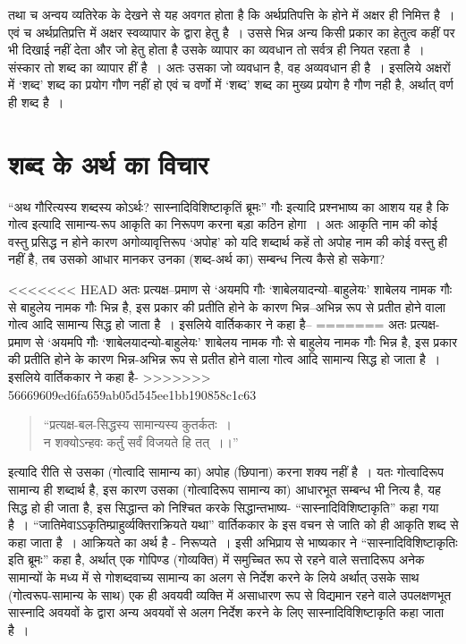 तथा च अन्वय व्यतिरेक के देखने से यह अवगत होता है कि अर्थप्रतिपत्ति के होने में अक्षर ही निमित्त है~। एवं च अर्थप्रतिप्रत्ति में अक्षर स्वव्यापार के द्वारा हेतु है~। उससे भिन्न अन्य किसी प्रकार का हेतुत्व कहीं पर भी दिखाई नहीं देता और जो हेतु होता है उसके व्यापार का व्यवधान तो सर्वत्र ही नियत रहता है~। संस्कार तो शब्द का व्यापार हीं है~। अतः उसका जो व्यवधान है, वह अव्यवधान ही है~। इसलिये अक्षरों में ‘शब्द' शब्द का प्रयोग गौण नहीं हो एवं च वर्णो में ‘शब्द' शब्द का मुख्य प्रयोग है गौण नही है, अर्थात् वर्ण ही शब्द है~।


\section*{शब्द के अर्थ का विचार}

\vskip -6pt

“अथ गौरित्यस्य शब्दस्य कोऽर्थः? सास्नादिविशिष्टाकृतिं ब्रूमः” गौः इत्यादि प्रश्नभाष्य का आशय यह है कि गोत्व इत्यादि सामान्य-रूप आकृति का निरूपण करना बड़ा कठिन होगा~। अतः आकृति नाम की कोई वस्तु प्रसिद्ध न होने कारण अगोव्यावृत्तिरूप ‘अपोह' को यदि शब्दार्थ कहें तो अपोह नाम की कोई वस्तु ही नहीं है, तब उसको आधार मानकर उनका (शब्द-अर्थ का) सम्बन्ध नित्य कैसे हो सकेगा?

<<<<<<< HEAD
अतः प्रत्यक्ष–प्रमाण से ‘अयमपि गौः ‘शाबेलयादन्यो–बाहुलेयः' शाबेलय नामक गौः से बाहुलेय नामक गौः भिन्न है, इस प्रकार की प्रतीति होने के कारण भिन्न–अभिन्न रूप से प्रतीत होने वाला गोत्व आदि सामान्य सिद्ध हो जाता है~। इसलिये वार्तिककार ने कहा है–
=======
अतः प्रत्यक्ष-प्रमाण से ‘अयमपि गौः ‘शाबेलयादन्यो-बाहुलेयः' शाबेलय नामक गौः से बाहुलेय नामक गौः भिन्न है, इस प्रकार की प्रतीति होने के कारण भिन्न-अभिन्न रूप से प्रतीत होने वाला गोत्व आदि सामान्य सिद्ध हो जाता है~। इसलिये वार्तिककार ने कहा है-
>>>>>>> 56669609ed6fa659ab05d545ee1bb190858c1c63

\vskip 4pt

\begin{verse}
“प्रत्यक्ष-बल-सिद्धस्य सामान्यस्य कुतर्कतः~।\\न शक्योऽन्हवः कर्तुं सर्वं विजयते हि तत्~।।”
\end{verse}

\vskip 4pt

इत्यादि रीति से उसका (गोत्वादि सामान्य का) अपोह (छिपाना) करना शक्य नहीं है~। यतः गोत्वादिरूप सामान्य ही शब्दार्थ है, इस कारण उसका (गोत्वादिरूप सामान्य का) आधारभूत सम्बन्ध भी नित्य है, यह सिद्ध हो ही जाता है, इस सिद्धान्त को निश्चित करके सिद्धान्तभाष्य- “सास्नादिविशिष्टाकृति” कहा गया है~। “जातिमेवाऽऽकृतिम्प्राहुर्व्यक्तिराक्रियते यथा” वार्तिककार के इस वचन से जाति को ही आकृति शब्द से कहा जाता है~। आक्रियते का अर्थ है - निरूप्यते~। इसी अभिप्राय से भाष्यकार ने “सास्नादिविशिष्टाकृतिः इति ब्रूमः” कहा है, अर्थात् एक गोपिण्ड (गोव्यक्ति) में समुच्चित रूप से रहने वाले सत्तादिरूप अनेक सामान्यों के मध्य में से गोशब्दवाच्य सामान्य का अलग से निर्देश करने के लिये अर्थात् उसके साथ (गोत्वरूप-सामान्य के साथ) एक ही अवयवी व्यक्ति में असाधारण रूप से विद्यमान रहने वाले उपलक्षणभूत सास्नादि अवयवों के द्वारा अन्य अवयवों से अलग निर्देश करने के लिए सास्नादिविशिष्टाकृति कहा जाता है~।


